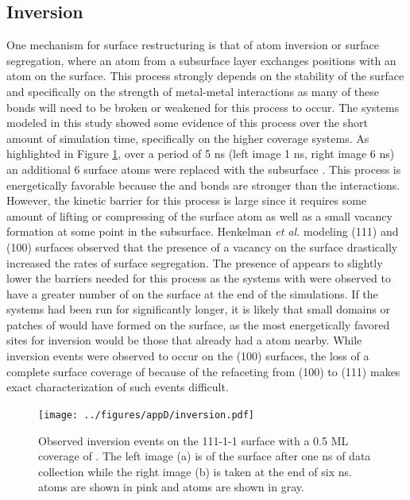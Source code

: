 \subsection{Inversion}
One mechanism for surface restructuring is that of atom inversion or surface
segregation, where an atom from a subsurface layer exchanges positions with an
atom on the surface.  This process strongly depends on the stability of the
surface and specifically on  the strength of metal-metal interactions as many
of these bonds will need to be broken or weakened for this process to occur.
The  systems modeled in this study showed some evidence of this
process over the short amount of simulation time, specifically on the higher
 coverage systems. As highlighted in Figure \ref{fig:inversion}, over a
period of 5 ns (left image 1 ns, right image 6 ns) an additional 6 
surface atoms were replaced with the subsurface .  This process is
energetically favorable because the  and 
bonds are stronger than the  interactions.  However, the
kinetic barrier for this process is large since it requires some amount of
lifting or compressing of the surface atom as well as a small vacancy formation
at some point in the subsurface. Henkelman {\em et al.} modeling (111) and
(100)  surfaces observed that the presence of a vacancy on the surface
drastically increased the rates of surface segregation.\citep{Kim:2013mi} The
presence of  appears to slightly lower the barriers needed for this
process as the systems with  were observed to have a greater number of
 on the surface at the end of the simulations. If the systems had been
run for significantly longer, it is likely that small domains or patches of
 would have formed on the surface, as the most energetically favored
sites for inversion would be those that already had a  atom nearby.
While inversion events were observed to occur on the (100) surfaces, the loss
of a complete surface coverage of  because of the refaceting from (100)
to (111) makes exact characterization of such events difficult.


\begin{figure}[p!]
\centering
\texttt{[image: ../figures/appD/inversion.pdf]}
\caption{Observed inversion events on the 111-1-1 surface with a
0.5 ML coverage of . The left image (a) is of the surface after one ns
of data collection while the right image (b) is taken at the end of six ns.
 atoms are shown in pink and  atoms are shown in gray.}
\label{fig:inversion}
\end{figure}

